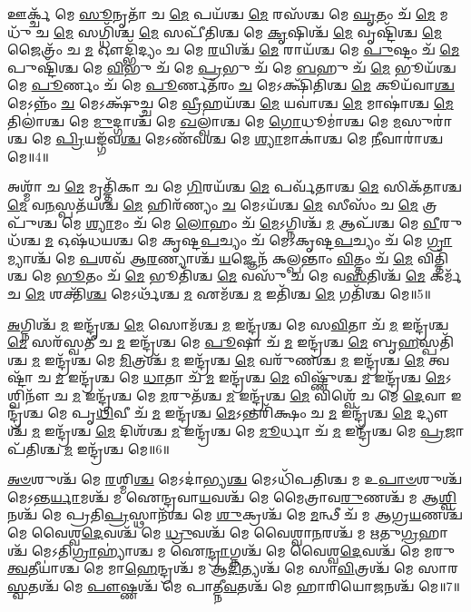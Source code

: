 𑌊𑌰𑍍𑌕𑍍𑌚᳴ 𑌮𑍇 \ul{𑌸𑍂}\-𑌨𑍃𑌤𑌾᳴ 𑌚 \ul{𑌮𑍇} 𑌪𑌯᳴𑌶𑍍𑌚 \ul{𑌮𑍇} 𑌰𑌸᳴𑌶𑍍𑌚 𑌮𑍇 \ul{𑌘𑍃}\-𑌤𑌂 𑌚᳴ \ul{𑌮𑍇} 𑌮𑌧𑍁᳴ 𑌚 \ul{𑌮𑍇} 𑌸𑌗𑍍𑌧𑌿᳴𑌶𑍍𑌚 \ul{𑌮𑍇} 𑌸𑌪𑍀᳴𑌤𑌿𑌶𑍍𑌚 𑌮𑍇 \ul{𑌕𑍃}\-𑌷𑌿𑌶𑍍𑌚᳴ \ul{𑌮𑍇} 𑌵𑍃𑌷𑍍𑌟𑌿᳴𑌶𑍍𑌚 \ul{𑌮𑍇} 𑌜𑍈𑌤𑍍𑌰𑌂᳴ 𑌚 \ul{𑌮} 𑌔𑌦𑍍𑌭𑌿᳴𑌦𑍍𑌯𑌂 𑌚 𑌮𑍇 \ul{𑌰}\-𑌯𑌿𑌶𑍍𑌚᳴ \ul{𑌮𑍇} 𑌰𑌾𑌯᳴𑌶𑍍𑌚 𑌮𑍇 \ul{𑌪𑍁}\-𑌷𑍍𑌟𑌂 𑌚᳴ \ul{𑌮𑍇} 𑌪𑍁𑌷𑍍𑌟𑌿᳴𑌶𑍍𑌚 𑌮𑍇 \ul{𑌵𑌿}\-𑌭𑍁 𑌚᳴ 𑌮𑍇 \ul{𑌪𑍍𑌰}\-𑌭𑍁 𑌚᳴ 𑌮𑍇 \ul{𑌬}\-𑌹𑍁 𑌚᳴ \ul{𑌮𑍇} 𑌭𑍂𑌯᳴𑌶𑍍𑌚 𑌮𑍇 \ul{𑌪𑍂}\-𑌰𑍍𑌣𑌂 𑌚᳴ 𑌮𑍇 \ul{𑌪𑍂}\-𑌰𑍍𑌣𑌤᳴𑌰𑌂 \ul{𑌚} 𑌮𑍇𑌽𑌕𑍍𑌷𑌿᳴𑌤𑌿𑌶𑍍𑌚 \ul{𑌮𑍇} 𑌕𑍂𑌯᳴𑌵𑌾\-\ul{𑌶𑍍𑌚} 𑌮𑍇𑌽𑌨𑍍𑌨𑌂᳴ \ul{𑌚} 𑌮𑍇𑌽𑌕𑍍𑌷𑍁᳴𑌚𑍍𑌚 𑌮𑍇 \ul{𑌵𑍍𑌰𑍀}\-𑌹𑌯᳴𑌶𑍍𑌚 \ul{𑌮𑍇} 𑌯𑌵𑌾॑𑌶𑍍𑌚 \ul{𑌮𑍇} 𑌮𑌾𑌷𑌾॑𑌶𑍍𑌚 \ul{𑌮𑍇} 𑌤𑌿𑌲𑌾॑𑌶𑍍𑌚 𑌮𑍇 \ul{𑌮𑍁}\-𑌦𑍍𑌗𑌾𑌶𑍍𑌚᳴ 𑌮𑍇 \ul{𑌖}\-𑌲𑍍𑌵𑌾॑𑌶𑍍𑌚 𑌮𑍇 \ul{𑌗𑍋}\-𑌧𑍂𑌮𑌾॑𑌶𑍍𑌚 𑌮𑍇 \ul{𑌮}\-𑌸𑍁𑌰𑌾॑𑌶𑍍𑌚 𑌮𑍇 \ul{𑌪𑍍𑌰𑌿}\-𑌯𑌙𑍍𑌗᳴𑌵\-\ul{𑌶𑍍𑌚} 𑌮𑍇𑌽𑌣᳴𑌵𑌶𑍍𑌚 𑌮𑍇 \ul{𑌶𑍍𑌯𑌾}\-𑌮𑌾𑌕𑌾॑𑌶𑍍𑌚 𑌮𑍇 \ul{𑌨𑍀}\-𑌵𑌾𑌰𑌾॑𑌶𑍍𑌚 𑌮𑍇॥4॥ 

𑌅𑌶𑍍𑌮𑌾᳴ 𑌚 \ul{𑌮𑍇} 𑌮𑍃𑌤𑍍𑌤𑌿᳴𑌕𑌾 𑌚 𑌮𑍇 \ul{𑌗𑌿}\-𑌰𑌯᳴𑌶𑍍𑌚 \ul{𑌮𑍇} 𑌪𑌰𑍍𑌵᳴𑌤𑌾𑌶𑍍𑌚 \ul{𑌮𑍇} 𑌸𑌿𑌕᳴𑌤𑌾𑌶𑍍𑌚 \ul{𑌮𑍇} 𑌵\-\ul{𑌨}\-𑌸𑍍𑌪𑌤᳴𑌯𑌶𑍍𑌚 \ul{𑌮𑍇} 𑌹𑌿𑌰᳴𑌣𑍍𑌯𑌂 \ul{𑌚} 𑌮𑍇𑌽𑌯᳴𑌶𑍍𑌚 \ul{𑌮𑍇} 𑌸𑍀𑌸𑌂᳴ 𑌚 \ul{𑌮𑍇} 𑌤𑍍𑌰𑌪𑍁᳴𑌶𑍍𑌚 𑌮𑍇 \ul{𑌶𑍍𑌯𑌾}\-𑌮𑌂 𑌚᳴ 𑌮𑍇 \ul{𑌲𑍋}\-𑌹𑌂 𑌚᳴ \ul{𑌮𑍇}\-𑌽𑌗𑍍𑌨𑌿𑌶𑍍𑌚᳴ \ul{𑌮} 𑌆𑌪᳴𑌶𑍍𑌚 𑌮𑍇 \ul{𑌵𑍀}\-𑌰𑍁𑌧᳴𑌶𑍍𑌚 \ul{𑌮} 𑌓𑌷᳴𑌧𑌯𑌶𑍍𑌚 𑌮𑍇 𑌕𑍃𑌷𑍍𑌟\-\ul{𑌪}\-𑌚𑍍𑌯𑌂 𑌚᳴ 𑌮𑍇𑌽𑌕𑍃𑌷𑍍𑌟\-\ul{𑌪}\-𑌚𑍍𑌯𑌂 𑌚᳴ 𑌮𑍇 \ul{𑌗𑍍𑌰𑌾}\-𑌮𑍍𑌯𑌾𑌶𑍍𑌚᳴ 𑌮𑍇 \ul{𑌪}\-𑌶𑌵᳴ 𑌆\-\ul{𑌰}\-𑌣𑍍𑌯𑌾𑌶𑍍𑌚᳴ \ul{𑌯}\-𑌜𑍍𑌞𑍇𑌨᳴ 𑌕𑌲𑍍𑌪𑌨𑍍𑌤𑌾𑌂 \ul{𑌵𑌿}\-𑌤𑍍𑌤𑌂 𑌚᳴ \ul{𑌮𑍇} 𑌵𑌿𑌤𑍍𑌤𑌿᳴𑌶𑍍𑌚 𑌮𑍇 \ul{𑌭𑍂}\-𑌤𑌂 𑌚᳴ \ul{𑌮𑍇} 𑌭𑍂𑌤𑌿᳴𑌶𑍍𑌚 \ul{𑌮𑍇} 𑌵𑌸𑍁᳴ 𑌚 𑌮𑍇 𑌵\-\ul{𑌸}\-𑌤𑌿𑌶𑍍𑌚᳴ \ul{𑌮𑍇} 𑌕𑌰𑍍𑌮᳴ 𑌚 \ul{𑌮𑍇} 𑌶𑌕𑍍𑌤𑌿᳴\-\ul{𑌶𑍍𑌚} 𑌮𑍇𑌽𑌰𑍍𑌥᳴𑌶𑍍𑌚 \ul{𑌮} 𑌏𑌮᳴𑌶𑍍𑌚 \ul{𑌮} 𑌇𑌤𑌿᳴𑌶𑍍𑌚 \ul{𑌮𑍇} 𑌗𑌤𑌿᳴𑌶𑍍𑌚 𑌮𑍇॥5॥ 

\-\ul{𑌅}\-𑌗𑍍𑌨𑌿𑌶𑍍𑌚᳴ \ul{𑌮} 𑌇𑌨𑍍𑌦𑍍𑌰᳴𑌶𑍍𑌚 \ul{𑌮𑍇} 𑌸𑍋𑌮᳴𑌶𑍍𑌚 \ul{𑌮} 𑌇𑌨𑍍𑌦𑍍𑌰᳴𑌶𑍍𑌚 𑌮𑍇 𑌸\-\ul{𑌵𑌿}\-𑌤𑌾 𑌚᳴ \ul{𑌮} 𑌇𑌨𑍍𑌦𑍍𑌰᳴𑌶𑍍𑌚 \ul{𑌮𑍇} 𑌸𑌰᳴𑌸𑍍𑌵𑌤𑍀 𑌚 \ul{𑌮} 𑌇𑌨𑍍𑌦𑍍𑌰᳴𑌶𑍍𑌚 𑌮𑍇 \ul{𑌪𑍂}\-𑌷𑌾 𑌚᳴ \ul{𑌮} 𑌇𑌨𑍍𑌦𑍍𑌰᳴𑌶𑍍𑌚 \ul{𑌮𑍇} 𑌬𑍃\-\ul{𑌹}\-𑌸𑍍𑌪𑌤𑌿᳴𑌶𑍍𑌚 \ul{𑌮} 𑌇𑌨𑍍𑌦𑍍𑌰᳴𑌶𑍍𑌚 𑌮𑍇 \ul{𑌮𑌿}\-𑌤𑍍𑌰𑌶𑍍𑌚᳴ \ul{𑌮} 𑌇𑌨𑍍𑌦𑍍𑌰᳴𑌶𑍍𑌚 \ul{𑌮𑍇} 𑌵𑌰𑍁᳴𑌣𑌶𑍍𑌚 \ul{𑌮} 𑌇𑌨𑍍𑌦𑍍𑌰᳴𑌶𑍍𑌚 \ul{𑌮𑍇} 𑌤𑍍𑌵𑌷𑍍𑌟𑌾᳴ 𑌚 \ul{𑌮} 𑌇𑌨𑍍𑌦𑍍𑌰᳴𑌶𑍍𑌚 𑌮𑍇 \ul{𑌧𑌾}\-𑌤𑌾 𑌚᳴ \ul{𑌮} 𑌇𑌨𑍍𑌦𑍍𑌰᳴𑌶𑍍𑌚 \ul{𑌮𑍇} 𑌵𑌿𑌷𑍍𑌣𑍁᳴𑌶𑍍𑌚 \ul{𑌮} 𑌇𑌨𑍍𑌦𑍍𑌰᳴𑌶𑍍𑌚 \ul{𑌮𑍇}\-𑌽𑌶𑍍𑌵𑌿𑌨𑍗᳴ 𑌚 \ul{𑌮} 𑌇𑌨𑍍𑌦𑍍𑌰᳴𑌶𑍍𑌚 𑌮𑍇 \ul{𑌮}\-𑌰𑍁𑌤᳴𑌶𑍍𑌚 \ul{𑌮} 𑌇𑌨𑍍𑌦𑍍𑌰᳴𑌶𑍍𑌚 \ul{𑌮𑍇} 𑌵𑌿𑌶𑍍𑌵𑍇᳴ 𑌚 𑌮𑍇 \ul{𑌦𑍇}\-𑌵𑌾 𑌇𑌨𑍍𑌦𑍍𑌰᳴𑌶𑍍𑌚 𑌮𑍇 𑌪𑍃\-\ul{𑌥𑌿}\-𑌵𑍀 𑌚᳴ \ul{𑌮} 𑌇𑌨𑍍𑌦𑍍𑌰᳴𑌶𑍍𑌚 \ul{𑌮𑍇}\-𑌽𑌨𑍍𑌤𑌰𑌿᳴𑌕𑍍𑌷𑌂 𑌚 \ul{𑌮} 𑌇𑌨𑍍𑌦𑍍𑌰᳴𑌶𑍍𑌚 \ul{𑌮𑍇} 𑌦𑍍𑌯𑍗𑌶𑍍𑌚᳴ \ul{𑌮} 𑌇𑌨𑍍𑌦𑍍𑌰᳴𑌶𑍍𑌚 \ul{𑌮𑍇} 𑌦𑌿𑌶᳴𑌶𑍍𑌚 \ul{𑌮} 𑌇𑌨𑍍𑌦𑍍𑌰᳴𑌶𑍍𑌚 𑌮𑍇 \ul{𑌮𑍂}\-𑌰𑍍𑌧𑌾 𑌚᳴ \ul{𑌮} 𑌇𑌨𑍍𑌦𑍍𑌰᳴𑌶𑍍𑌚 𑌮𑍇 \ul{𑌪𑍍𑌰}\-𑌜𑌾𑌪᳴𑌤𑌿𑌶𑍍𑌚 \ul{𑌮} 𑌇𑌨𑍍𑌦𑍍𑌰᳴𑌶𑍍𑌚 𑌮𑍇॥6॥ 

\-\ul{𑌅}\-\-\ul{𑍞}\-𑌶𑍁𑌶𑍍𑌚᳴ 𑌮𑍇 \ul{𑌰}\-𑌶𑍍𑌮𑌿\-\ul{𑌶𑍍𑌚} 𑌮𑍇𑌽𑌦𑌾॑𑌭𑍍𑌯\-\ul{𑌶𑍍𑌚} 𑌮𑍇𑌽𑌧𑌿᳴𑌪𑌤𑌿𑌶𑍍𑌚 𑌮 𑌉\-\ul{𑌪𑌾}\-\-\ul{𑍞}\-𑌶𑍁𑌶𑍍𑌚᳴ 𑌮𑍇𑌽𑌨𑍍𑌤\-\ul{𑌰𑍍𑌯𑌾}\-𑌮𑌶𑍍𑌚᳴ 𑌮 𑌐𑌨𑍍𑌦𑍍𑌰𑌵𑌾\-\ul{𑌯}\-𑌵𑌶𑍍𑌚᳴ 𑌮𑍇 𑌮𑍈𑌤𑍍𑌰𑌾𑌵\-\ul{𑌰𑍁}\-𑌣𑌶𑍍𑌚᳴ 𑌮 𑌆\-\ul{𑌶𑍍𑌵𑌿}\-𑌨𑌶𑍍𑌚᳴ 𑌮𑍇 𑌪𑍍𑌰𑌤𑌿\-\ul{𑌪𑍍𑌰}\-𑌸𑍍𑌥𑌾𑌨᳴𑌶𑍍𑌚 𑌮𑍇 \ul{𑌶𑍁}\-𑌕𑍍𑌰𑌶𑍍𑌚᳴ 𑌮𑍇 \ul{𑌮}\-𑌨𑍍𑌥𑍀 𑌚᳴ 𑌮 𑌆𑌗𑍍𑌰\-\ul{𑌯}\-𑌣𑌶𑍍𑌚᳴ 𑌮𑍇 𑌵𑍈𑌶𑍍𑌵\-\ul{𑌦𑍇}\-𑌵𑌶𑍍𑌚᳴ 𑌮𑍇 \ul{𑌧𑍍𑌰𑍁}\-𑌵𑌶𑍍𑌚᳴ 𑌮𑍇 𑌵𑍈𑌶𑍍𑌵𑌾\-\ul{𑌨}\-𑌰𑌶𑍍𑌚᳴ 𑌮 𑌋𑌤𑍁\-\ul{𑌗𑍍𑌰}\-𑌹𑌾𑌶𑍍𑌚᳴ 𑌮𑍇𑌽𑌤𑌿\-\ul{𑌗𑍍𑌰𑌾}\-𑌹𑍍𑌯𑌾॑𑌶𑍍𑌚 𑌮 𑌐\-\ul{𑌨𑍍𑌦𑍍𑌰𑌾}\-𑌗𑍍𑌨𑌶𑍍𑌚᳴ 𑌮𑍇 𑌵𑍈𑌶𑍍𑌵\-\ul{𑌦𑍇}\-𑌵𑌶𑍍𑌚᳴ 𑌮𑍇 𑌮𑌰𑍁\-\ul{𑌤𑍍𑌵}\-𑌤𑍀𑌯𑌾॑𑌶𑍍𑌚 𑌮𑍇 𑌮𑌾\-\ul{𑌹𑍇}\-𑌨𑍍𑌦𑍍𑌰𑌶𑍍𑌚᳴ 𑌮 𑌆\-\ul{𑌦𑌿}\-𑌤𑍍𑌯𑌶𑍍𑌚᳴ 𑌮𑍇 𑌸𑌾\-\ul{𑌵𑌿}\-𑌤𑍍𑌰𑌶𑍍𑌚᳴ 𑌮𑍇 𑌸𑌾𑌰\-\ul{𑌸𑍍𑌵}\-𑌤𑌶𑍍𑌚᳴ 𑌮𑍇 \ul{𑌪𑍗}\-𑌷𑍍𑌣𑌶𑍍𑌚᳴ 𑌮𑍇 𑌪𑌾𑌤𑍍𑌨𑍀\-\ul{𑌵}\-𑌤𑌶𑍍𑌚᳴ 𑌮𑍇 𑌹𑌾𑌰𑌿𑌯𑍋\-\ul{𑌜}\-𑌨𑌶𑍍𑌚᳴ 𑌮𑍇॥7॥ 

